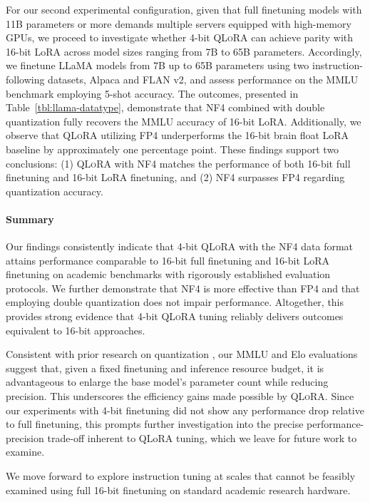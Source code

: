 For our second experimental configuration, given that full finetuning models with 11B parameters or more demands multiple servers equipped with high-memory GPUs, we proceed to investigate whether 4-bit \textsc{QLoRA} can achieve parity with 16-bit LoRA across model sizes ranging from 7B to 65B parameters. Accordingly, we finetune LLaMA models from 7B up to 65B parameters using two instruction-following datasets, Alpaca and FLAN v2, and assess performance on the MMLU benchmark employing 5-shot accuracy. The outcomes, presented in Table~\ref{tbl:llama-datatype}, demonstrate that NF4 combined with double quantization fully recovers the MMLU accuracy of 16-bit LoRA. Additionally, we observe that \textsc{QLoRA} utilizing FP4 underperforms the 16-bit brain float LoRA baseline by approximately one percentage point. These findings support two conclusions: (1) \textsc{QLoRA} with NF4 matches the performance of both 16-bit full finetuning and 16-bit LoRA finetuning, and (2) NF4 surpasses FP4 regarding quantization accuracy.

\paragraph{Summary} Our findings consistently indicate that 4-bit \textsc{QLoRA} with the NF4 data format attains performance comparable to 16-bit full finetuning and 16-bit LoRA finetuning on academic benchmarks with rigorously established evaluation protocols. We further demonstrate that NF4 is more effective than FP4 and that employing double quantization does not impair performance. Altogether, this provides strong evidence that 4-bit \textsc{QLoRA} tuning reliably delivers outcomes equivalent to 16-bit approaches.

Consistent with prior research on quantization \citep{dettmers2022case}, our MMLU and Elo evaluations suggest that, given a fixed finetuning and inference resource budget, it is advantageous to enlarge the base model’s parameter count while reducing precision. This underscores the efficiency gains made possible by \textsc{QLoRA}. Since our experiments with 4-bit finetuning did not show any performance drop relative to full finetuning, this prompts further investigation into the precise performance-precision trade-off inherent to QLoRA tuning, which we leave for future work to examine.

We move forward to explore instruction tuning at scales that cannot be feasibly examined using full 16-bit finetuning on standard academic research hardware.

